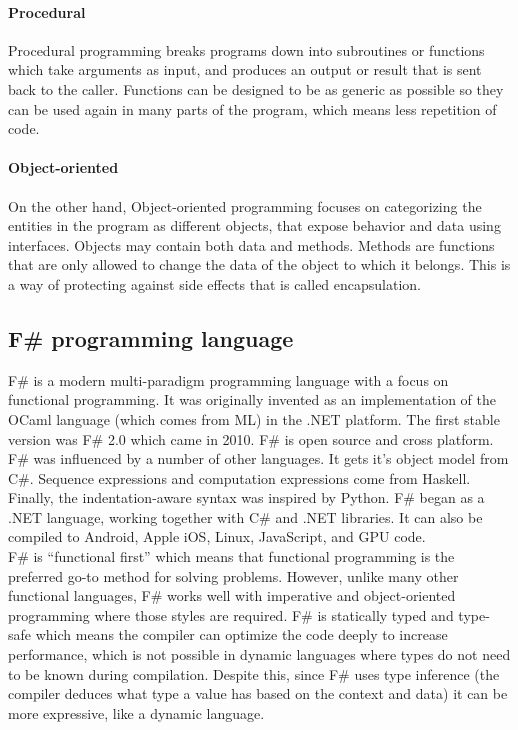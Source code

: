 \documentclass[12pt, a4paper]{article}
\begin{document}
\newpage
\paragraph{Procedural} Procedural programming breaks programs down into subroutines or functions which take arguments as input, and produces an output or result that is sent back to the caller. Functions can be designed to be as generic as possible so they can be used again in many parts of the program, which means less repetition of code.

\paragraph{Object-oriented} On the other hand, Object-oriented programming focuses on categorizing the entities in the program as different objects, that expose behavior and data using interfaces. Objects may contain both data and methods. Methods are functions that are only allowed to change the data of the object to which it belongs. This is a way of protecting against side effects that is called encapsulation.


\newpage
\subsection{F\# programming language}
F\# is a modern multi-paradigm programming language with a focus on functional programming. It was originally invented as an implementation of the OCaml language (which comes from ML) in the .NET platform. The first stable version was F\# 2.0 which came in 2010. F\# is open source and cross platform. F\# was influenced by a number of other languages. It gets it’s object model from C\#. Sequence expressions and computation expressions come from Haskell. Finally, the indentation-aware syntax was inspired by Python. F\# began as a .NET language, working together with C\# and .NET libraries. It can also be compiled to Android, Apple iOS, Linux, JavaScript, and GPU code.\\

F\# is “functional first” which means that functional programming is the preferred go-to method for solving problems. However, unlike many other functional languages, F\# works well with imperative and object-oriented programming where those styles are required. F\# is statically typed and type-safe which means the compiler can optimize the code deeply to increase performance, which is not possible in dynamic languages where types do not need to be known during compilation. Despite this, since F\# uses type inference (the compiler deduces what type a value has based on the context and data) it can be more expressive, like a dynamic language.\\
\end{document}
